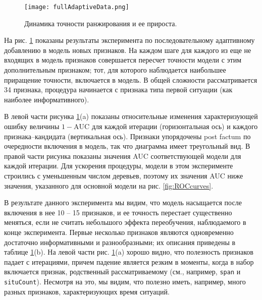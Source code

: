 \begin{figure}[thpb]
\caption{Динамика точности ранжирования и ее прироста.}
\label{fig:adaptiveAdditionScores}
\texttt{[image: fullAdaptiveData.png]}
\end{figure}



На рис. \ref{fig:adaptiveAdditionScores} показаны результаты эксперимента по последовательному адаптивному добавлению в модель новых признаков. На каждом шаге для каждого из еще не входящих в модель признаков совершается пересчет точности модели с этим дополнительным признаком; тот, для которого наблюдается наибольшее приращение точности, включается в модель. В общей сложности рассматривается 34 признака, процедура начинается с признака типа первой ситуации (как наиболее информативного).

В левой части рисунка \ref{fig:adaptiveAdditionScores}(a) показаны относительные изменения характеризующей ошибку величины $1-\text{AUC}$ для каждой итерации (горизонтальная ось) и каждого признака--кандидата (вертикальная ось). Признаки упорядочены post factum по очередности включения в модель, так что диаграмма имеет треугольный вид. В правой части рисунка показаны значения AUC соответствующей модели для каждой итерации. Для ускорения процедуры, модели в этом эксперименте строились с уменьшенным числом деревьев, поэтому их значения AUC ниже значения, указанного для основной модели на рис. \ref{fig:ROCcurves}.

В результате данного эксперимента мы видим, что модель насыщается после включения в нее 10 -- 15 признаков, и ее точность перестает существенно меняться, если не считать небольшого эффекта переобучения, наблюдаемого в конце эксперимента. Первые несколько признаков являются одновременно достаточно информативными и разнообразными; их описания приведены в таблице \ref{fig:adaptiveAdditionScores}(b). На левой части рис. \ref{fig:adaptiveAdditionScores}(a) хорошо видно, что полезность признаков падает с итерациями, причем падение является резким в моменты, когда в набор включается признак, родственный рассматриваемому (см., например, \texttt{span} и \texttt{situCount}). Несмотря на это, мы видим, что полезно иметь, например, много разных признаков, характеризующих время ситуаций.

